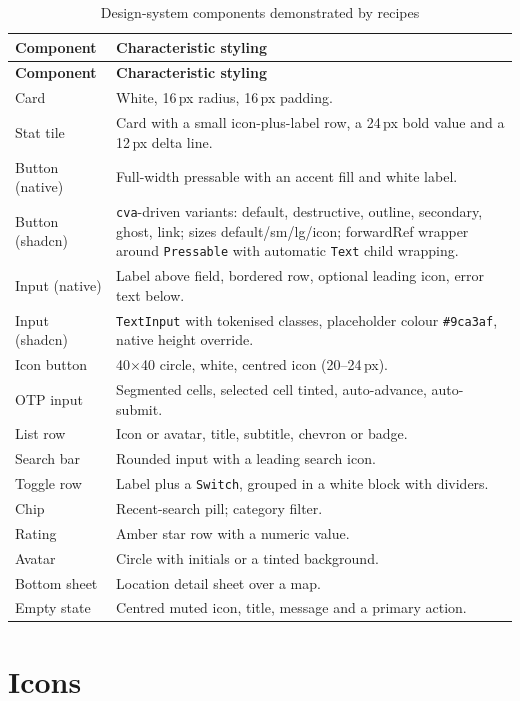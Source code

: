 \begin{longtable}{@{}L{3.6cm}L{10.6cm}@{}}
\caption{Design-system components demonstrated by recipes}\\
\toprule
\textbf{Component} & \textbf{Characteristic styling} \\
\midrule
\endfirsthead
\toprule
\textbf{Component} & \textbf{Characteristic styling} \\
\midrule
\endhead
Card & White, 16\,px radius, 16\,px padding. \\
Stat tile & Card with a small icon-plus-label row, a 24\,px bold value and a 12\,px
delta line. \\
Button (native) & Full-width pressable with an accent fill and white label. \\
Button (shadcn) & \texttt{cva}-driven variants: default, destructive, outline,
secondary, ghost, link; sizes default/sm/lg/icon; forwardRef wrapper around
\texttt{Pressable} with automatic \texttt{Text} child wrapping. \\
Input (native) & Label above field, bordered row, optional leading icon, error text
below. \\
Input (shadcn) & \texttt{TextInput} with tokenised classes, placeholder colour
\texttt{\#9ca3af}, native height override. \\
Icon button & 40$\times$40 circle, white, centred icon (20--24\,px). \\
OTP input & Segmented cells, selected cell tinted, auto-advance, auto-submit. \\
List row & Icon or avatar, title, subtitle, chevron or badge. \\
Search bar & Rounded input with a leading search icon. \\
Toggle row & Label plus a \texttt{Switch}, grouped in a white block with dividers. \\
Chip & Recent-search pill; category filter. \\
Rating & Amber star row with a numeric value. \\
Avatar & Circle with initials or a tinted background. \\
Bottom sheet & Location detail sheet over a map. \\
Empty state & Centred muted icon, title, message and a primary action. \\
\bottomrule
\end{longtable}

\section{Icons}

